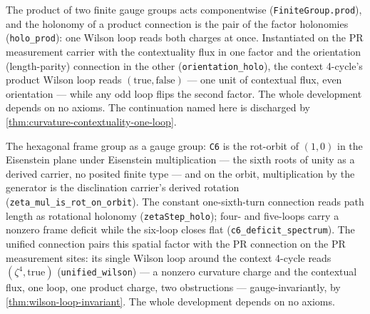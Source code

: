 \begin{theorem}\label{thm:product-connection}\leanok{}
The product of two finite gauge groups acts componentwise
(\texttt{FiniteGroup.prod}), and the holonomy of a product connection is the
pair of the factor holonomies (\texttt{holo\_prod}): one Wilson loop reads
both charges at once. Instantiated on the PR measurement carrier with the
contextuality flux in one factor and the orientation (length-parity)
connection in the other (\texttt{orientation\_holo}), the context 4-cycle's
product Wilson loop reads \((\mathrm{true}, \mathrm{false})\) --- one unit
of contextual flux, even orientation --- while any odd loop flips the second
factor. The whole development depends on no axioms. The continuation named
here is discharged by \cref{thm:curvature-contextuality-one-loop}.
\end{theorem}

\begin{theorem}\label{thm:curvature-contextuality-one-loop}\leanok{}
The hexagonal frame group as a gauge group: \texttt{C6} is the rot-orbit
of $(1,0)$ in the Eisenstein plane under Eisenstein multiplication --- the
sixth roots of unity as a derived carrier, no posited finite type --- and
on the orbit, multiplication by the generator is the disclination
carrier's derived rotation (\texttt{zeta\_mul\_is\_rot\_on\_orbit}). The
constant one-sixth-turn connection reads path length as rotational
holonomy (\texttt{zetaStep\_holo}); four- and five-loops carry a nonzero
frame deficit while the six-loop closes flat
(\texttt{c6\_deficit\_spectrum}). The unified connection pairs this
spatial factor with the PR connection on the PR measurement sites: its
single Wilson loop around the context 4-cycle reads
$(\zeta^4, \mathrm{true})$ (\texttt{unified\_wilson}) --- a nonzero
curvature charge and the contextual flux, one loop, one product charge,
two obstructions --- gauge-invariantly, by
\cref{thm:wilson-loop-invariant}. The whole development depends on no
axioms.
\end{theorem}

